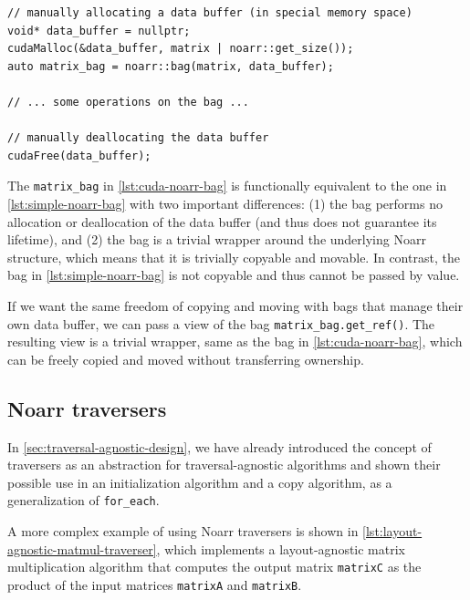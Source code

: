 \begin{lstlisting}[style=C++, caption={Defining a Noarr bag with an externally managed data buffer}, label={lst:cuda-noarr-bag}, basicstyle=\ttfamily\scriptsize]
// manually allocating a data buffer (in special memory space)
void* data_buffer = nullptr;
cudaMalloc(&data_buffer, matrix | noarr::get_size());
auto matrix_bag = noarr::bag(matrix, data_buffer);

// ... some operations on the bag ...

// manually deallocating the data buffer
cudaFree(data_buffer);
\end{lstlisting}

The \lstinline{matrix_bag} in \cref{lst:cuda-noarr-bag} is functionally equivalent to the one in \cref{lst:simple-noarr-bag} with two important differences: (1) the bag performs no allocation or deallocation of the data buffer (and thus does not guarantee its lifetime), and (2) the bag is a trivial wrapper around the underlying Noarr structure, which means that it is trivially copyable and movable. In contrast, the bag in \cref{lst:simple-noarr-bag} is not copyable and thus cannot be passed by value.

If we want the same freedom of copying and moving with bags that manage their own data buffer, we can pass a view of the bag \lstinline{matrix_bag.get_ref()}. The resulting view is a trivial wrapper, same as the bag in \cref{lst:cuda-noarr-bag}, which can be freely copied and moved without transferring ownership.


\subsection{Noarr traversers}\label{sec:noarr-traversers}

In \cref{sec:traversal-agnostic-design}, we have already introduced the concept of traversers as an abstraction for traversal-agnostic algorithms and shown their possible use in an initialization algorithm and a copy algorithm, as a generalization of \lstinline{for_each}.

A more complex example of using Noarr traversers is shown in \cref{lst:layout-agnostic-matmul-traverser}, which implements a layout-agnostic matrix multiplication algorithm that computes the output matrix \lstinline{matrixC} as the product of the input matrices \lstinline{matrixA} and \lstinline{matrixB}.

